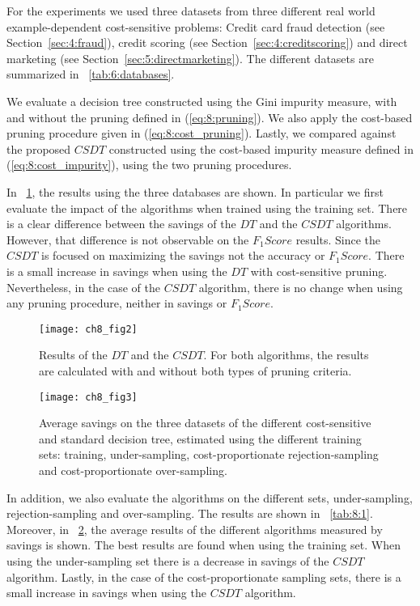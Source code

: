 For the experiments we used three datasets from three different real world example-dependent 
cost-sensitive problems: Credit card fraud detection (see Section~\ref{sec:4:fraud}), credit 
scoring (see Section~\ref{sec:4:creditscoring}) and direct marketing (see 
Section~\ref{sec:5:directmarketing}). The different datasets are summarized in 
\tablename{~\ref{tab:6:databases}}.

We evaluate a decision tree constructed using the Gini impurity measure, with and without the 
pruning defined in (\ref{eq:8:pruning}). We also apply    the cost-based pruning procedure given 
in (\ref{eq:8:cost_pruning}). Lastly, we compared against     the proposed $CSDT$ constructed 
using the cost-based impurity measure defined in (\ref{eq:8:cost_impurity}), using the two 
pruning procedures.

In \figurename{~\ref{fig:8:2}}, the results using the three databases are shown. In particular we 
first evaluate the impact of the algorithms when trained using the training set. There is a clear 
difference between the savings of the $DT$ and the $CSDT$ algorithms. However, that difference 
is not observable on the $F_1Score$ results. Since the $CSDT$ is focused on maximizing the 
savings not the accuracy or $F_1Score$. There is a small increase in savings when using the 
$DT$ with cost-sensitive pruning. Nevertheless, in the case of the $CSDT$ algorithm, there is 
no change when using any pruning procedure, neither in savings or $F_1Score$.

\begin{figure}[t]
  \centering
  \texttt{[image: ch8\_fig2]}
  \caption{Results of the $DT$ and the $CSDT$. For both algorithms, the results are 
  calculated with and without both types of pruning  criteria.}
\label{fig:8:2}
\end{figure}
\begin{figure}[t]
  \centering
  \texttt{[image: ch8\_fig3]}
  \caption{Average savings on the three datasets of the different cost-sensitive and standard 
  decision tree,  estimated using the different training sets: training, under-sampling, 
  cost-proportionate rejection-sampling  and cost-proportionate over-sampling.}
  \label{fig:8:3}
\end{figure}

In addition, we also evaluate the algorithms on the different sets, under-sampling, 
rejection-sampling and over-sampling. The results are shown in \tablename{~\ref{tab:8:1}}. 
Moreover, in \figurename{~\ref{fig:8:3}}, the average results of the different algorithms measured 
by savings is shown. The best results are found when using the training set. When using the 
under-sampling set there is a decrease in savings of the $CSDT$ algorithm. Lastly, in the case of 
the cost-proportionate sampling sets, there is a small increase in savings when using the $CSDT$ 
algorithm. 


